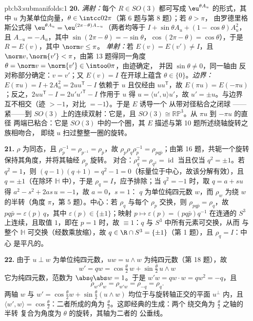 \begin{solution}{pb:b3:submanifolds:1}
\textbf{20.} \emph{满射：}每个 $R \in SO(3)$ 都可写成
$\eu^{\theta A_u}$ 的形式，其中 $u$ 为某单位向量，$\theta \in
\intcc0{2\pi}$（第 6 题与第 8 题）；若 $\theta > \pi$，
由罗德里格斯公式得 $\eu^{\theta A_u} = \eu^{(2\pi -
\theta)A_{-u}}$（两者均等于 $I + \sin\theta A_u + (1 -
\cos\theta)A_u^2$，且 $A_{-u} = -A_u$，其中 $\sin(2\pi -
\theta) = -\sin\theta$，$\cos(2\pi - \theta) =
\cos\theta$），于是 $R = E(v)$，其中 $\norm v \leq \pi$。
\emph{单射：}若 $E(v) = E(v') \neq I$，且
$\norm v, \norm{v'} < \pi$，由第 13 题得同一角度
$\theta = \norm v = \norm{v'} \in \intoo0\pi$，由迹确定，
并因 $\sin\theta \neq 0$，同一轴由
反对称部分确定：$v = v'$；又 $E(v) = I$
在开球上蕴含 $\theta \in \{0\}$。\emph{边界：}
$E(\pi u) = I + 2A_u^2 = 2uu^{\mathsf T} - I$ 依赖于
$u$ 且仅经由 $uu^{\mathsf T}$，故 $E(\pi u) =
E(-\pi u)$；反之，$2uu^{\mathsf T} - I =
2u'u'^{\mathsf T} - I$ 作用于 $u$ 得 $u = \langle
u', u\rangle u'$，故 $u' = \pm u$。与边界
互不相交（迹 $> -1$，对比 $= -1$）。于是 $E$ 诱导一个
从带对径粘合之闭球
——紧——到 $SO(3)$ 上的连续双射：它是，且 $SO(3)
\cong \mathbb{RP}^3$。从 $\pi u$ 到 $-\pi u$ 的直径
两端已粘合：它是 $SO(3)$ 中的一个圈，其
$E$ 描述与第 10 题所述绕轴旋转之族相吻合，
即绕 $u$ 扫过整整一圈的旋转。

\textbf{21.} $\rho$ 为同态，且 $\rho_p^{-1} =
\rho_{p^{-1}} = \rho_{\bar p}$，故 $\rho_p\rho_q\rho_p^{-1}
= \rho_{pq\bar p}$；由第 16 题，共轭一个旋转
保持其角度，并将其轴经 $\rho_p$ 旋转。
对合：$\rho_q^2 = \rho_{q^2} = \operatorname{id}$
当且仅当 $q^2 = \pm1$。若 $q^2 = 1$，则 $(q - 1)(q + 1) = q^2 -
1 = 0$（标量位于中心，故该分解有效），且
$q = \pm1$（在除环 $\mathbb H$ 中），于是 $\rho_q
= I$，应予排除；当 $q^2 = -1$ 时，取 $q = a +
su$ 得 $a^2 - s^2 + 2as\,u = -1$，故 $a = 0$，$s = 1$：
$q$ 为单位纯四元数 $w$，而 $\rho_w$ 为绕
$w$ 的半转（角度 $\pi$，第 5 题）。中心：若 $\rho_q$
与每个 $\rho_p$ 交换，则 $\rho_{pq\bar p} = \rho_q$，故
$pq\bar p = \varepsilon(p)\,q$，其中 $\varepsilon(p) \in
\{\pm1\}$；映射 $p \mapsto \varepsilon(p) = (pq\bar p)q^{-1}$
在连通的 $S^3$ 上连续，且取值 $1$，即在 $p =
1$ 时，故 $\equiv 1$：$q$ 与 $S^3$ 中所有元素可交换，从而
与整个 $\mathbb H$ 可交换（经数乘放缩），故 $q \in \R \cap S^3 =
\{\pm1\}$（第 1 题），且 $\rho_q = I$：中心
是平凡的。

\textbf{22.} 由于 $u \perp w$ 为单位纯四元数，$uw =
u\wedge w$ 为纯四元数（第 18 题），故
\[
w' = qw = \cos\tfrac\theta2\,w + \sin\tfrac\theta2\,u\wedge
w
\]
它为纯四元数，范数为 $\abs q\abs w = 1$。于是 $w'w = qw\cdot w
= qw^2 = -q$，且
\[
\rho_{w'}\rho_w = \rho_{w'w} = \rho_{-q} = \rho_q .
\]
两轴 $w$ 与 $w' = \cos\frac\theta2 w +
\sin\frac\theta2(u\wedge w)$ 均位于与旋转轴正交的平面 $u^\perp$
内，且 $\langle w', w\rangle
= \cos\frac\theta2$：二者所成的角为
$\frac\theta2$。这即经典的生成：两个
绕交角为 $\frac\theta2$ 之轴的半转
复合为角度为 $\theta$ 的旋转，其轴为二者的
公垂线。


\end{solution}
